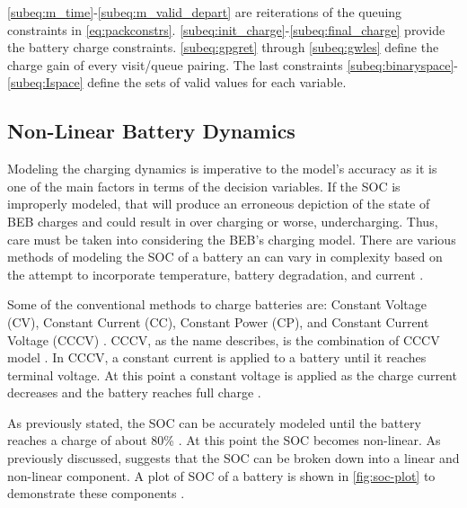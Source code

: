 \documentclass[ee,msthesis]{usuthesis}
\begin{document}
\autoref{subeq:m_time}-\autoref{subeq:m_valid_depart} are reiterations of the queuing constraints in
\autoref{eq:packconstrs}. \autoref{subeq:init_charge}-\autoref{subeq:final_charge} provide the battery charge
constraints. \autoref{subeq:gpgret} through \autoref{subeq:gwles} define the charge gain of every visit/queue
pairing. The last constraints \autoref{subeq:binaryspace}-\autoref{subeq:Ispace} define the sets of valid values for each
variable.

\subsection{Non-Linear Battery Dynamics}
\label{sec:non-linear-battery-dynamics}
Modeling the charging dynamics is imperative to the model's accuracy as it is one of the main factors in terms of the
decision variables. If the SOC is improperly modeled, that will produce an erroneous depiction of the state of BEB
charges and could result in over charging or worse, undercharging. Thus, care must be taken into considering the BEB's
charging model. There are various methods of modeling the SOC of a battery an can vary in complexity based on the
attempt to incorporate temperature, battery degradation, and current
\cite{zhang-2021-optim-elect,chen-2008-desig-grey,watrin-2012-multip-lithium}.

Some of the conventional methods to charge batteries are: Constant Voltage (CV), Constant Current (CC), Constant Power
(CP), and Constant Current Voltage (CCCV) \cite{arabsalmanabadi-2018-charg-techn}. CCCV, as the name describes, is the
combination of CCCV model \cite{abdollahi-2016-optim-batter,chen-2008-desig-grey,wang-2021-resear-optim}. In CCCV,
a constant current is applied to a battery until it reaches terminal voltage. At this point a constant voltage is
applied as the charge current decreases and the battery reaches full charge \cite{chen-2008-desig-grey}.

As previously stated, the SOC can be accurately modeled until the battery reaches a charge of about 80\%
\cite{liu-2020-batter-elect}. At this point the SOC becomes non-linear. As previously discussed,
\cite{zhang-2021-optim-elect} suggests that the SOC can be broken down into a linear and non-linear component. A plot
of SOC of a battery is shown in \ref{fig:soc-plot} to demonstrate these components \cite{zhang-2021-optim-elect}.
\end{document}
